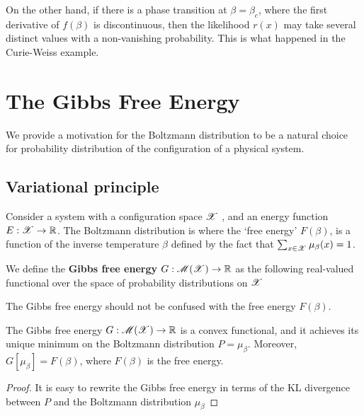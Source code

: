 \documentclass[letterpaper,english,10pt]{article}
\begin{document}
On the other hand, if there is a phase transition at $\beta = \beta_c$, 
where the first derivative of $f(\beta)$ is discontinuous, 
then the likelihood $r(x)$ may take several distinct values with a non-vanishing probability. 
This is what happened in the Curie-Weiss example. 

\section{The Gibbs Free Energy} 
We provide a motivation for the Boltzmann distribution to be a natural choice for probability distribution of the configuration of a physical system. 
\subsection{Variational principle}
Consider a system with a configuration space $\mathscr{X}$ , and an energy function $E: \mathscr{X} \to \mathbb{R}$. 
The Boltzmann distribution is 
where the `free energy' $F(\beta)$, is a function of the inverse temperature $\beta$ defined by the fact that $\sum_{x \in \mathscr{X}} \mu_\beta(x) = 1$. 
\begin{defn}
We define the \textbf{Gibbs free energy} $G: \mathscr{M}(\mathscr{X}) \to \mathbb{R}$ as the following real-valued functional over the space of probability distributions on $\mathscr{X}$
\end{defn}
The Gibbs free energy should not be confused with the free energy $F(\beta)$. 
\begin{prop}
The Gibbs free energy $G: \mathscr{M}(\mathscr{X}) \to \mathbb{R}$ is a convex functional, 
and it achieves its unique minimum on the Boltzmann distribution $P = \mu_\beta$. 
Moreover, $G[\mu_\beta] = F(\beta)$, where $F(\beta)$ is the free energy.
\end{prop}
\begin{proof}
It is easy to rewrite the Gibbs free energy in terms of the KL divergence between $P$ and the Boltzmann distribution $\mu_\beta$
\end{proof}
\end{document}
